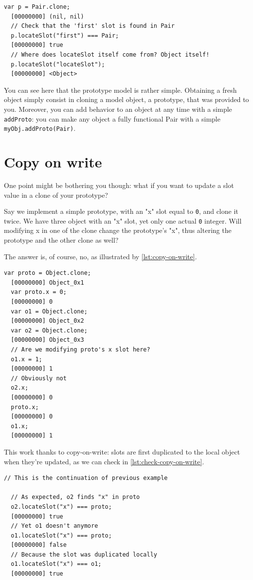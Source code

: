 \documentclass[openright,twoside,12pt]{report}
\newcommand{\lst}[1]{\autoref{lst:#1}}
\begin{document}
\begin{lstlisting}[caption=Using locateSlot, label=lst:locateslot]
  var p = Pair.clone;
  [00000000] (nil, nil)
  // Check that the 'first' slot is found in Pair
  p.locateSlot("first") === Pair;
  [00000000] true
  // Where does locateSlot itself come from? Object itself!
  p.locateSlot("locateSlot");
  [00000000] <Object>
\end{lstlisting}

You can see here that the prototype model is rather simple. Obtaining
a fresh object simply consist in cloning a model object, a prototype,
that was provided to you. Moreover, you can add behavior to an object
at any time with a simple \texttt{addProto}: you can make any object a
fully functional Pair with a simple \lstinline|myObj.addProto(Pair)|.

\section{Copy on write}

One point might be bothering you though: what if you want to update a
slot value in a clone of your prototype?

Say we implement a simple prototype, with an "x" slot equal to
\lstinline|0|, and clone it twice. We have three object with an "x"
slot, yet only one actual \lstinline|0| integer. Will modifying x in
one of the clone change the prototype's "x", thus altering the
prototype and the other clone as well?

The answer is, of course, no, as illustrated by \lst{copy-on-write}.

\begin{lstlisting}[caption=Copy on write in action,
  label=lst:copy-on-write]
  var proto = Object.clone;
  [00000000] Object_0x1
  var proto.x = 0;
  [00000000] 0
  var o1 = Object.clone;
  [00000000] Object_0x2
  var o2 = Object.clone;
  [00000000] Object_0x3
  // Are we modifying proto's x slot here?
  o1.x = 1;
  [00000000] 1
  // Obviously not
  o2.x;
  [00000000] 0
  proto.x;
  [00000000] 0
  o1.x;
  [00000000] 1
\end{lstlisting}

This work thanks to copy-on-write: slots are first duplicated to the
local object when they're updated, as we can check in
\lst{check-copy-on-write}.

\begin{lstlisting}[caption=Inspecting copy on write,
  label=lst:check-copy-on-write]
  // This is the continuation of previous example

  // As expected, o2 finds "x" in proto
  o2.locateSlot("x") === proto;
  [00000000] true
  // Yet o1 doesn't anymore
  o1.locateSlot("x") === proto;
  [00000000] false
  // Because the slot was duplicated locally
  o1.locateSlot("x") === o1;
  [00000000] true
\end{lstlisting}
\end{document}
